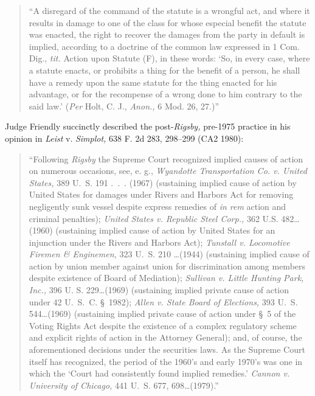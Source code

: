     \begin{quote}
		\newpage  ``A disregard of the command of the statute is a wrongful act, and where it results in damage to one of the class for whose especial benefit the statute was enacted, the right to recover the damages from the party in default is implied, according to a doctrine of the common law expressed in 1 Com. Dig., \emph{tit.} Action upon Statute (F), in these words: ‘So, in every case, where a statute enacts, or prohibits a thing for the benefit of a person, he shall have a remedy upon the same statute for the thing enacted for his advantage, or for the recompense of a wrong done to him contrary to the said law.' (\emph{Per} Holt, C. J., \emph{Anon.,} 6 Mod. 26, 27.)''
	\end{quote}

  Judge Friendly succinctly described the post-\emph{Rigsby,} pre-1975 practice in his opinion in \emph{Leist} v. \emph{Simplot,} 638 F. 2d 283, 298--299 (CA2 1980):

\begin{quote}

	``Following \emph{Rigsby} the Supreme Court recognized implied causes of action on numerous occasions, see, e. g., \emph{Wyandotte Transportation Co. v. United States,} 389 U.~S. 191 .~.~. (1967) (sustaining implied cause of action by United States for damages under Rivers and Harbors Act for removing negligently sunk vessel despite express remedies of \emph{in rem} action and criminal penalties); \emph{United States v. Republic Steel Corp.,} 362 U.S. 482\dots (1960) (sustaining implied cause of action by United \newpage  States for an injunction under the Rivers and Harbors Act); \emph{Tunstall v. Locomotive Firemen \& Enginemen,} 323 U.~S. 210 \dots (1944) (sustaining implied cause of action by union member against union for discrimination among members despite existence of Board of Mediation); \emph{Sullivan v. Little Hunting Park, Inc.,} 396 U. S. 229\dots (1969) (sustaining implied private cause of action under 42 U.~S.~C. \S~1982); \emph{Allen v. State Board of Elections,} 393 U.~S. 544\dots (1969) (sustaining implied private cause of action under \S~5 of the Voting Rights Act despite the existence of a complex regulatory scheme and explicit rights of action in the Attorney General); and, of course, the aforementioned decisions under the securities laws. As the Supreme Court itself has recognized, the period of the 1960's and early 1970's was one in which the ‘Court had consistently found implied remedies.' \emph{Cannon v. University of Chicago,} 441 U.~S. 677, 698\dots (1979).''

\end{quote}

